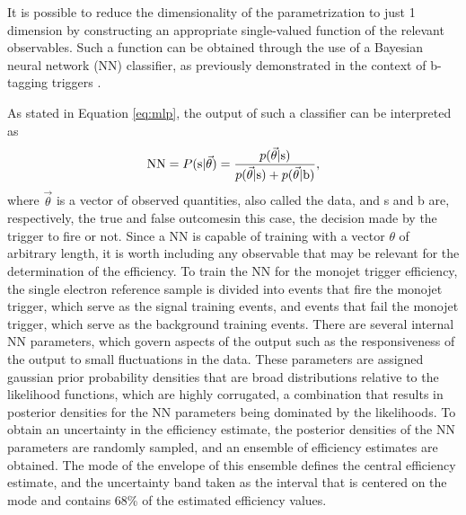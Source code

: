 It is possible to reduce the dimensionality of the parametrization to just 1 dimension by constructing an appropriate single-valued function of the relevant observables. Such a function can be obtained through the use of a Bayesian neural network (NN) classifier, as previously demonstrated in the context of b-tagging triggers \cite{bib:SezenTrigger}. 

As stated in Equation \ref{eq:mlp}, the output of such a classifier can be interpreted as
\begin{equation}
\text{NN} = P(\text{s}|\vec{\theta}) = \frac{p(\vec{\theta} | {\rm s})}{p(\vec{\theta} | {\rm s})+p(\vec{\theta} | {\rm b})},
\end{equation}
where $\vec{\theta}$ is a vector of observed quantities, also called the data, and s and b are, respectively, the true and false outcomes\textemdash in this case, the decision made by the trigger to fire or not. Since a NN is capable of training with a vector $\theta$ of arbitrary length, it is worth including any observable that may be relevant for the determination of the efficiency. To train the NN for the monojet trigger efficiency, the single electron reference sample is divided into events that fire the monojet trigger, which serve as the signal training events, and events that fail the monojet trigger, which serve as the background training events. There are several internal NN parameters, which govern aspects of the output such as the responsiveness of the output to small fluctuations in the data. These parameters are assigned gaussian prior probability densities that are broad distributions relative to the likelihood functions, which are highly corrugated, a combination that results in posterior densities for the NN parameters being dominated by the likelihoods. To obtain an uncertainty in the efficiency estimate, the posterior densities of the NN parameters are randomly sampled, and an ensemble of efficiency estimates are obtained. The mode of the envelope of this ensemble defines the central efficiency estimate, and the uncertainty band taken as the interval that is centered on the mode and contains 68\% of the estimated efficiency values. 

